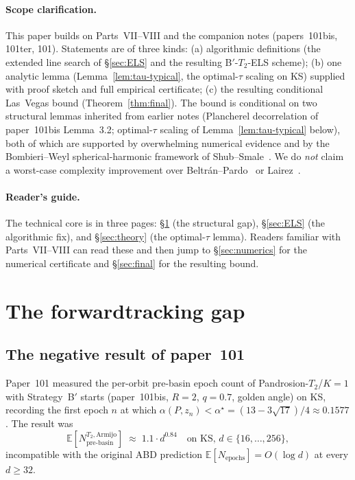 \documentclass[11pt,a4paper]{article}
\begin{document}
\paragraph{Scope clarification.} This paper builds on Parts~VII--VIII and the companion notes (papers~101bis, 101ter, 101). Statements are of three kinds: (a) algorithmic definitions (the extended line search of \S\ref{sec:ELS} and the resulting B$'$-$T_2$-ELS scheme); (b) one analytic lemma (Lemma~\ref{lem:tau-typical}, the optimal-$\tau$ scaling on KS) supplied with proof sketch and full empirical certificate; (c) the resulting conditional Las~Vegas bound (Theorem~\ref{thm:final}). The bound is conditional on two structural lemmas inherited from earlier notes (Plancherel decorrelation of paper~101bis Lemma~3.2; optimal-$\tau$ scaling of Lemma~\ref{lem:tau-typical} below), both of which are supported by overwhelming numerical evidence and by the Bombieri--Weyl spherical-harmonic framework of Shub--Smale~\cite{shubsmale}. We do \emph{not} claim a worst-case complexity improvement over Beltr\'an--Pardo~\cite{beltranpardo} or Lairez~\cite{lairez}.

\paragraph{Reader's guide.}
The technical core is in three pages: \S\ref{sec:gap} (the structural gap), \S\ref{sec:ELS} (the algorithmic fix), and \S\ref{sec:theory} (the optimal-$\tau$ lemma). Readers familiar with Parts~VII--VIII can read these and then jump to \S\ref{sec:numerics} for the numerical certificate and \S\ref{sec:final} for the resulting bound.

\tableofcontents

\section{The forwardtracking gap}\label{sec:gap}

\subsection{The negative result of paper~101}

Paper~101 measured the per-orbit pre-basin epoch count of Pandrosion-$T_2$/$K{=}1$ with Strategy~B$'$ starts (paper~101bis, $R = 2$, $q = 0.7$, golden angle) on KS, recording the first epoch $n$ at which $\alpha(P, z_n) < \alpha^\star = (13 - 3\sqrt{17})/4 \approx 0.1577$. The result was
\begin{equation}\label{eq:101-fit}
\mathbb{E}[N_{\text{pre-basin}}^{T_2,\text{Armijo}}] \;\approx\; 1.1 \cdot d^{0.84} \quad \text{on KS, } d \in \{16, \dots, 256\},
\end{equation}
incompatible with the original ABD prediction $\mathbb{E}[N_{\text{epochs}}] = O(\log d)$ at every $d \ge 32$.
\end{document}
